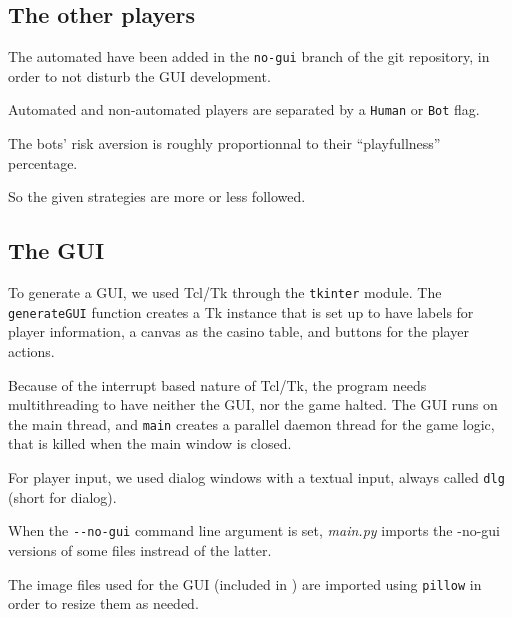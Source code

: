 \documentclass[a4paper, twoside]{report}
\begin{document}
        \subsection{The other players}
            The automated have been added in the \texttt{no-gui} branch of the git repository, in order to not disturb the GUI development.
            \par Automated and non-automated players are separated by a \texttt{Human} or \texttt{Bot} flag.
            \par The bots' risk aversion is roughly proportionnal to their ``playfullness'' percentage.
            \par So the given strategies are more or less followed.

        \subsection{The GUI}
            To generate a GUI, we used Tcl/Tk through the \texttt{tkinter} module. The \texttt{generateGUI} function creates a Tk instance that is set up to have labels for player information, a canvas as the casino table, and buttons for the player actions.
            \par Because of the interrupt based nature of Tcl/Tk, the program needs multithreading to have neither the GUI, nor the game halted. The GUI runs on the main thread, and \texttt{main} creates a parallel daemon thread for the game logic, that is killed when the main window is closed.
            \par For player input, we used dialog windows with a textual input, always called \texttt{dlg} (short for dialog).
            \par When the \texttt{-{}-no-gui} command line argument is set, \textit{main.py} imports the -no-gui versions of some files instread of the latter.
            \par The image files used for the GUI (included in ) are imported using \texttt{pillow} in order to resize them as needed.






\appendix
\appendixpage
\addappheadtotoc
\end{document}
